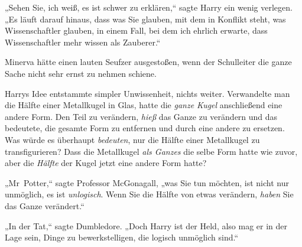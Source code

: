 „Sehen Sie, ich weiß, es ist schwer zu erklären,“ sagte Harry ein wenig verlegen. „Es läuft darauf hinaus, dass was Sie glauben, mit dem in Konflikt steht, was Wissenschaftler glauben, in einem Fall, bei dem ich ehrlich erwarte, dass Wissenschaftler mehr wissen als Zauberer.“

Minerva hätte einen lauten Seufzer ausgestoßen, wenn der Schulleiter die ganze Sache nicht sehr ernst zu nehmen schiene.

Harrys Idee entstammte simpler Unwissenheit, nichts weiter. Verwandelte man die Hälfte einer Metallkugel in Glas, hatte die \emph{ganze Kugel} anschließend eine andere Form. Den Teil zu verändern, \emph{hieß} das Ganze zu verändern und das bedeutete, die gesamte Form zu entfernen und durch eine andere zu ersetzen. Was würde es überhaupt \emph{bedeuten}, nur die Hälfte einer Metallkugel zu transfigurieren? Dass die Metallkugel \emph{als Ganzes} die selbe Form hatte wie zuvor, aber die \emph{Hälfte} der Kugel jetzt eine andere Form hatte?

„Mr~Potter,“ sagte Professor McGonagall, „was Sie tun möchten, ist nicht nur unmöglich, es ist \emph{unlogisch}. Wenn Sie die Hälfte von etwas verändern, \emph{haben} Sie das Ganze verändert.“

„In der Tat,“ sagte Dumbledore. „Doch Harry ist der Held, also mag er in der Lage sein, Dinge zu bewerkstelligen, die logisch unmöglich sind.“

